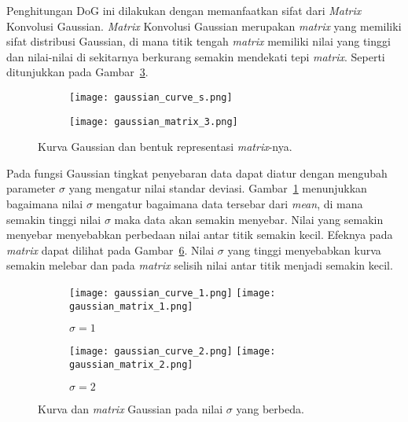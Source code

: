 Penghitungan DoG ini dilakukan dengan memanfaatkan sifat dari \textit{Matrix} Konvolusi Gaussian. \textit{Matrix} Konvolusi Gaussian merupakan \textit{matrix} yang memiliki sifat distribusi Gaussian, di mana titik tengah \textit{matrix} memiliki nilai yang tinggi dan nilai-nilai di sekitarnya berkurang semakin mendekati tepi \textit{matrix}. Seperti ditunjukkan pada Gambar~\ref{fig:gaussian_function}. 
\begin{figure}[H]
	\begin{subfigure}[b]{.5\textwidth}
		\centering
		\texttt{[image: gaussian\_curve\_s.png]}
		\caption{}
		\label{subfig:gaussian_curve}
	\end{subfigure}%
	\begin{subfigure}[b]{.5\textwidth}
		\centering
		\texttt{[image: gaussian\_matrix\_3.png]}
		\caption{}
		\label{subfig:gaussian_matrix}
	\end{subfigure}
	\caption{Kurva Gaussian dan bentuk representasi \textit{matrix}-nya.}
	\label{fig:gaussian_function}
\end{figure}

Pada fungsi Gaussian tingkat penyebaran data dapat diatur dengan mengubah parameter $\sigma$ yang mengatur nilai standar deviasi. Gambar~\ref{subfig:gaussian_curve} menunjukkan bagaimana nilai $\sigma$ mengatur bagaimana data tersebar dari \textit{mean}, di mana semakin tinggi nilai $\sigma$ maka data akan semakin menyebar. Nilai yang semakin menyebar menyebabkan perbedaan nilai antar titik semakin kecil. Efeknya pada \textit{matrix} dapat dilihat pada Gambar~\ref{fig:gaussian_sigma}. Nilai $\sigma$ yang tinggi menyebabkan kurva semakin melebar dan pada \textit{matrix} selisih nilai antar titik menjadi semakin kecil.

\begin{figure}[H]
	\begin{subfigure}[b]{.5\textwidth}
		\centering
		\texttt{[image: gaussian\_curve\_1.png]}
		\texttt{[image: gaussian\_matrix\_1.png]}
		\caption{$\sigma=1$}
		\label{subfig:gaussian_sigma1}
	\end{subfigure}%
	\begin{subfigure}[b]{.5\textwidth}
		\centering
		\texttt{[image: gaussian\_curve\_2.png]}
		\texttt{[image: gaussian\_matrix\_2.png]}
		\caption{$\sigma=2$}
		\label{subfig:gaussian_sigma2}
	\end{subfigure}
	\caption{Kurva dan \textit{matrix} Gaussian pada nilai $\sigma$ yang berbeda.}
	\label{fig:gaussian_sigma}
\end{figure}

